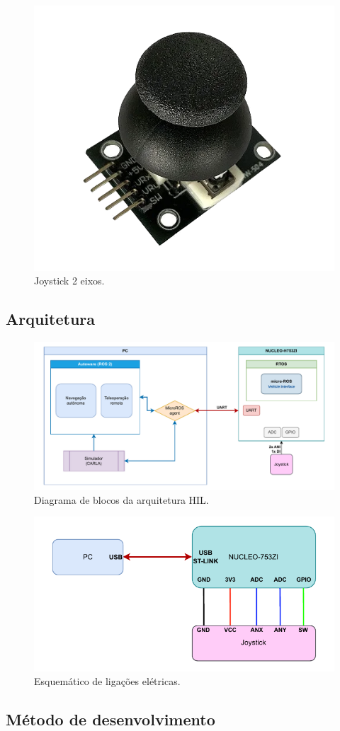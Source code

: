 \begin{figure}[H]
	\centering
	\includegraphics[width=0.3\linewidth]{img/joystick}
	\caption{Joystick 2 eixos.}
	\label{fig:joystick}
\end{figure}

\subsection{Arquitetura}

\begin{figure}[H]
	\centering
	\includegraphics[width=0.75\linewidth]{img/block_diagram.pdf}
	\caption{Diagrama de blocos da arquitetura HIL.}
	\label{fig:blockdiagram}
\end{figure}

\begin{figure}[H]
	\centering
	\includegraphics[width=0.5\linewidth]{img/esquematico.pdf}
	\caption{Esquemático de ligações elétricas.}
	\label{fig:esquematico}
\end{figure}


\subsection{Método de desenvolvimento}


